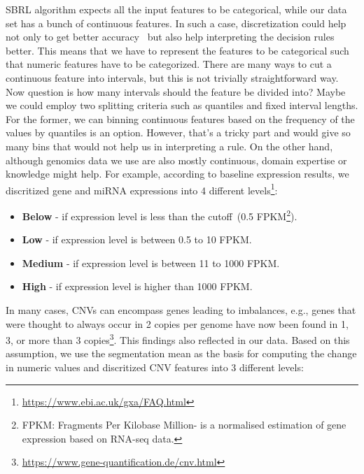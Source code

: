 \hspace*{3.5mm} SBRL algorithm expects all the input features to be categorical, while our data set has a bunch of continuous features. In such a case, discretization could help not only to get better accuracy~\cite{maslove2013discretization} but also help interpreting the decision rules better. This means that we have to represent the features to be categorical such that numeric features have to be categorized. There are many ways to cut a continuous feature into intervals, but this is not trivially straightforward way. Now question is how many intervals should the feature be divided into? Maybe we could employ two splitting criteria such as quantiles and fixed interval lengths. For the former, we can binning continuous features based on the frequency of the values by quantiles is an option. However, that's a tricky part and would give so many bins that would not help us in interpreting a rule. On the other hand, although genomics data we use are also mostly continuous, domain expertise or knowledge might help. For example, according to baseline expression results, we discritized gene and miRNA expressions into 4 different levels\footnote{\url{https://www.ebi.ac.uk/gxa/FAQ.html}}:

\vspace{-2mm}
\begin{itemize}[noitemsep]
    \item \textbf{Below} - if expression level is less than the cutoff~(0.5 FPKM\footnote{FPKM: Fragments Per Kilobase Million- is a normalised estimation of gene expression based on RNA-seq data.}).
    \item \textbf{Low} - if expression level is between 0.5 to 10 FPKM.
    \item \textbf{Medium} - if expression level is between 11 to 1000 FPKM. 
    \item \textbf{High} - if expression level is higher than 1000 FPKM. 
\end{itemize}

\hspace*{3.5mm} In many cases, CNVs can encompass genes leading to imbalances, e.g., genes that were thought to always occur in 2 copies per genome have now been found in 1, 3, or more than 3  copies\footnote{\url{https://www.gene-quantification.de/cnv.html}}. This findings also reflected in our data. Based on this assumption, we use the segmentation mean as the basis for computing the change in numeric values and discritized CNV features into 3 different levels:  

